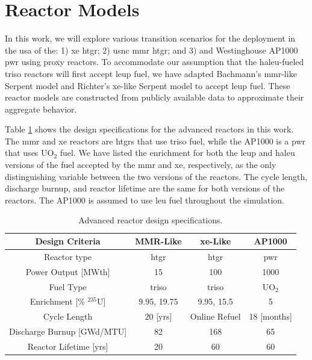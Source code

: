 \section{Reactor Models}
\label{sec:reactor_models}

In this work, we will explore various transition scenarios for the deployment in the \gls{usa} of the: 1) \gls{xe} \gls{htgr}; 2) \gls{usnc} \gls{mmr} \gls{htgr}; and 3) and Westinghouse AP1000 \gls{pwr} using proxy reactors. To accommodate our assumption that the \gls{haleu}-fueled \gls{triso} reactors will first accept \gls{leup} fuel, we have adapted Bachmann's \gls{mmr}-like Serpent model \cite{bachmann_mmr_like_2023} and Richter's \gls{xe}-like Serpent model \cite{richter_xe100_like} to accept \gls{leup} fuel. These reactor models are constructed from publicly available data to approximate their aggregate behavior.

Table \ref{tab:ar_defs} shows the design specifications for the advanced reactors in this work. The \gls{mmr} and \gls{xe} reactors are \gls{htgr}s that use \gls{triso} fuel, while the AP1000 is a \gls{pwr} that uses UO$_2$ fuel. We have listed the enrichment for both the \gls{leup} and \gls{haleu} versions of the fuel accepted by the \gls{mmr} and \gls{xe}, respectively, as the only distinguishing variable between the two versions of the reactors. The cycle length, discharge burnup, and reactor lifetime are the same for both versions of the reactors. The AP1000 is assumed to use \gls{leu} fuel throughout the simulation.

\begin{table}[H]
   \centering
   \caption{Advanced reactor design specifications.}
   \label{tab:ar_defs}
   \begin{tabular}{c c c c}
      \hline
      \textbf{Design Criteria} & \textbf{MMR-Like} \cite{usnc_design_2021} & \textbf{\gls{xe}-Like} \cite{nuscale_chapter_2018} & \textbf{AP1000} \\
      \hline
      Reactor type & \gls{htgr} & \gls{htgr} & \gls{pwr} \\
      Power Output [MWth] & 15 & 100 & 1000 \\
      Fuel Type & \gls{triso} & \gls{triso} & UO$_2$ \\
      Enrichment [\% $^{235}$U] & 9.95, 19.75 & 9.95, 15.5 & 5 \\
      Cycle Length & 20 [yrs] & Online Refuel & 18 [months] \\
      Discharge Burnup [GWd/MTU] & 82 & 168 & 65 \\
      Reactor Lifetime [yrs] & 20 & 60 & 60 \\
      \hline
   \end{tabular}
\end{table}

